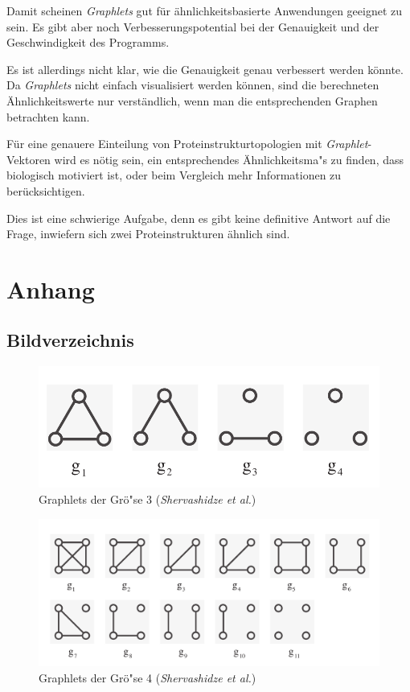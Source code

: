 \documentclass{report}
\begin{document}
Damit scheinen \textit{Graphlets} gut f\"ur \"ahnlichkeitsbasierte Anwendungen geeignet zu sein. Es gibt aber noch Verbesserungspotential bei der Genauigkeit und der Geschwindigkeit des Programms.

Es ist allerdings nicht klar, wie die Genauigkeit genau verbessert werden k\"onnte. Da \textit{Graphlets} nicht einfach visualisiert werden k\"onnen, sind die berechneten \"Ahnlichkeitswerte nur verst\"andlich, wenn man die entsprechenden Graphen betrachten kann.

F\"ur eine genauere Einteilung von Proteinstrukturtopologien mit \textit{Graphlet}-Vektoren wird es n\"otig sein, ein entsprechendes \"Ahnlichkeitsma"s zu finden, dass biologisch motiviert ist, oder beim Vergleich mehr Informationen zu ber\"ucksichtigen. 

Dies ist eine schwierige Aufgabe, denn es gibt keine definitive Antwort auf die Frage, inwiefern sich zwei Proteinstrukturen \"ahnlich sind.

\chapter{Anhang}


\section{Bildverzeichnis}

\begin{figure}[H]
\includegraphics[width =\linewidth]{3graphlets.pdf}
\caption{Graphlets der Gr\"o"se 3 (\textit{Shervashidze et al.})}
\label{fig:3graphlets}
\end{figure}

\begin{figure}[H]
\includegraphics[width =\linewidth]{4graphlets.pdf}
\caption{Graphlets der Gr\"o"se 4 (\textit{Shervashidze et al.})}
\label{fig:4graphlets}
\end{figure}
\end{document}
